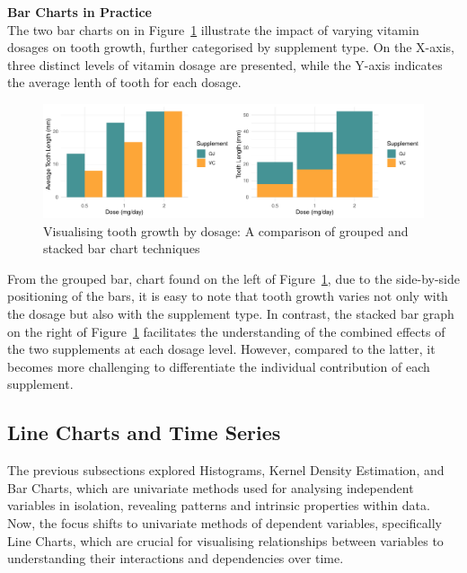 \documentclass{article}\usepackage[]{graphicx}\usepackage[]{xcolor}
\makeatletter
\def\maxwidth{ %
  \ifdim\Gin@nat@width>\linewidth
    \linewidth
  \else
    \Gin@nat@width
  \fi
}
\newenvironment{knitrout}{}{} %
\numberwithin{equation}{section}
\makeatother
\begin{document}
\noindent \textbf{Bar Charts in Practice}\\
\noident The two bar charts on in Figure~\ref{fig:barcharts} illustrate the impact of varying vitamin dosages on tooth growth, further categorised by supplement type. On the X-axis, three distinct levels of vitamin dosage are presented, while the Y-axis indicates the average lenth of tooth for each dosage.


\begin{knitrout}\scriptsize
{}\color{fgcolor}\begin{figure}[H]

{\centering \includegraphics[width=\maxwidth]{figure/beamer-barcharts-1} 

}

\caption[Visualising tooth growth by dosage]{Visualising tooth growth by dosage: A comparison of grouped and stacked bar chart techniques}\label{fig:barcharts}
\end{figure}

\end{knitrout}

\noindent From the grouped bar, chart found on the left of Figure~\ref{fig:barcharts}, due to the side-by-side positioning of the bars, it is easy to note that tooth growth varies not only with the dosage but also with the supplement type. In contrast, the stacked bar graph on the right of Figure~\ref{fig:barcharts} facilitates the understanding of the combined effects of the two supplements at each dosage level. However, compared to the latter, it becomes more challenging to differentiate the individual contribution of each supplement.

\subsection{Line Charts and Time Series}

\noindent
The previous subsections explored Histograms, Kernel Density Estimation, and Bar Charts, which are univariate methods used for analysing independent variables in isolation, revealing patterns and intrinsic properties within data. Now, the focus shifts to univariate methods of dependent variables, specifically Line Charts, which are crucial for visualising relationships between variables to understanding their interactions and dependencies over time.
\end{document}
